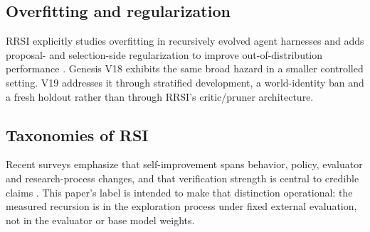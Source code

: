 \subsection{Overfitting and regularization}

RRSI explicitly studies overfitting in recursively evolved agent harnesses and adds proposal- and selection-side regularization to improve out-of-distribution performance \cite{xia2026rrsi}. Genesis V18 exhibits the same broad hazard in a smaller controlled setting. V19 addresses it through stratified development, a world-identity ban and a fresh holdout rather than through RRSI's critic/pruner architecture.

\subsection{Taxonomies of RSI}

Recent surveys emphasize that self-improvement spans behavior, policy, evaluator and research-process changes, and that verification strength is central to credible claims \cite{chen2026rsisurvey}. This paper's \lthreep label is intended to make that distinction operational: the measured recursion is in the exploration process under fixed external evaluation, not in the evaluator or base model weights.

